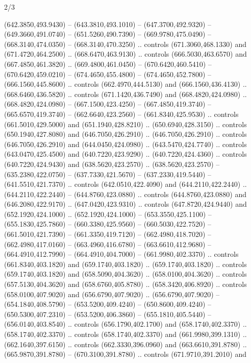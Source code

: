 \begin{flagdescription}{2/3}
\begin{scope}[xshift=0.5\flaglength,yshift=0.5\flagwidth,scale=\flagwidth/638.38]
\begin{scope}[y=0.80pt, x=0.80pt, yscale=-1,shift={(-600,-400)}]
\begin{scope}[shift={(-0.02,2.173)}]
  (642.3850,493.9430) -- (643.3810,493.1010) -- (647.3700,492.9320) --
  (649.3660,491.0740) -- (651.5260,490.7390) -- (669.9780,475.0490) --
  (668.3140,474.0350) -- (668.3140,470.3250) .. controls (671.3060,468.1330) and
  (671.4720,464.2500) .. (668.6470,463.9130) .. controls (666.5030,463.6570) and
  (667.4850,461.3820) .. (669.4800,461.0450) -- (670.6420,460.5410) --
  (670.6420,459.0210) -- (674.4650,455.4800) -- (674.4650,452.7800) --
  (666.1560,445.8600) .. controls (662.4970,444.5130) and (666.1560,436.4130) ..
  (668.6460,436.5820) .. controls (671.1420,436.7490) and (668.4820,424.0980) ..
  (668.4820,424.0980) -- (667.1500,423.4250) -- (667.4850,419.3740) --
  (665.6570,419.3740) -- (662.6640,423.2560) -- (661.8340,425.9530) .. controls
  (661.5010,429.5000) and (651.1940,428.8210) .. (650.6940,428.3150) .. controls
  (650.1940,427.8080) and (646.7050,426.2910) .. (646.7050,426.2910) .. controls
  (646.7050,426.2910) and (644.0450,424.0980) .. (643.5470,424.7740) .. controls
  (643.0470,425.4500) and (640.7220,423.9290) .. (640.7220,424.4360) .. controls
  (640.7220,424.9430) and (638.5620,423.2570) .. (638.5620,423.2570) --
  (635.2380,422.0750) -- (637.7330,421.5670) -- (637.2330,419.5440) --
  (641.5510,421.7370) .. controls (642.0510,422.4090) and (644.2110,422.2440) ..
  (644.2110,422.2440) -- (644.8760,423.0880) .. controls (644.8760,423.0880) and
  (646.2080,422.9170) .. (647.0420,423.9310) .. controls (647.8720,424.9440) and
  (652.1920,424.1000) .. (652.1920,424.1000) -- (653.3550,425.1100) --
  (655.1830,425.7860) -- (660.3380,425.9560) -- (660.5030,422.7520) --
  (661.5010,421.7390) -- (661.3350,419.7120) -- (662.4980,418.7020) --
  (662.4980,417.0160) -- (663.4960,416.6780) -- (663.6610,412.9680) --
  (664.4910,412.7990) -- (664.4910,404.7000) -- (661.9980,402.3370) .. controls
  (661.8340,403.1820) and (659.1740,403.1820) .. (659.1740,403.1820) .. controls
  (659.1740,403.1820) and (658.5090,404.3620) .. (658.0100,404.3620) .. controls
  (657.5130,404.3620) and (658.6760,405.8780) .. (658.3420,406.8920) .. controls
  (658.0100,407.9020) and (656.6790,407.9020) .. (656.6790,407.9020) --
  (654.1840,408.5790) -- (653.5200,409.4240) -- (650.8600,409.4240) --
  (650.5300,407.2310) -- (653.5200,406.3860) -- (655.1810,405.5440) --
  (656.0140,403.8540) .. controls (656.1790,402.1700) and (658.1740,402.3370) ..
  (658.1740,402.3370) .. controls (658.1740,402.3370) and (661.9980,399.1310) ..
  (662.1640,397.6150) .. controls (662.3330,396.0960) and (663.6610,391.8780) ..
  (665.9870,391.8780) -- (670.3100,391.8780) .. controls (671.9710,391.2010) and

\end{scope}
\end{scope}
\end{scope}
\end{flagdescription}
